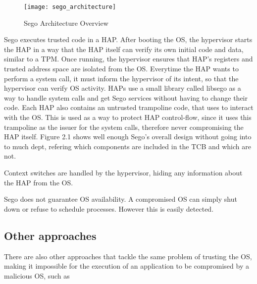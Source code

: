\begin{figure}[htbp]
	\centering
	{\texttt{[image: sego\_architecture]}}%
	\caption{Sego Architecture Overview}
\end{figure}


Sego executes trusted code in a HAP. After booting the OS, the hypervisor starts the HAP in a way that the HAP itself can verify its own initial code and data, similar to a TPM. Once running, the hypervisor ensures that HAP's registers and trusted address space are isolated from the OS. 
Everytime the HAP wants to perform a system call, it must inform the hypervisor of its intent, so that the hypervisor can verify OS activity. HAPs use a small library called libsego as a way to handle system calls and get Sego services without having to change their code. 
Each HAP also contains an untrusted trampoline code, that uses to interact with the OS. This is used as a way to protect HAP control-flow, since it uses this trampoline as the issuer for the system calls, therefore never compromising the HAP itself. Figure 2.1 shows well enough Sego's overall design without going into to much dept, refering which components are included in the TCB and which are not. 

Context switches are handled by the hypervisor, hiding any information about the HAP from the OS.

Sego does not guarantee OS availability. A compromised OS can simply shut down or refuse to schedule processes. However this is easily detected.




\subsection{Other approaches}

There are also other approaches that tackle the same problem of trusting the OS, making it impossible for the execution of an  application to be compromised by a malicious OS, such as 

